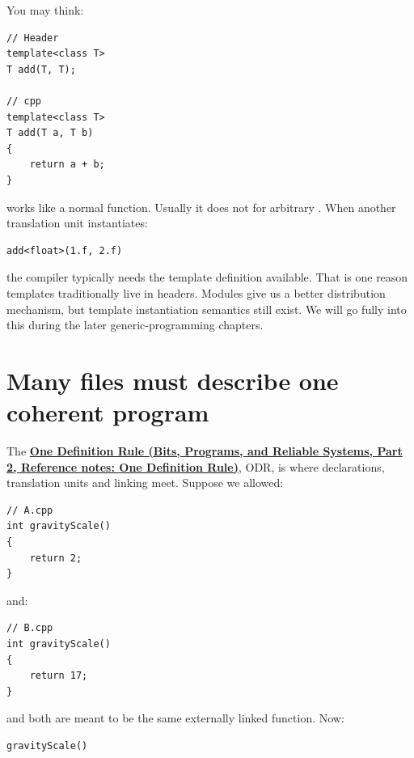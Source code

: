 \hypertarget{05-engine-i-ch002-templates-complicate-the-old-declarationimplementation-split}{}

You may think:

\begin{verbatim}
// Header
template<class T>
T add(T, T);

// cpp
template<class T>
T add(T a, T b)
{
    return a + b;
}
\end{verbatim}

works like a normal function. Usually it does not for arbitrary . When another translation unit instantiates:

\begin{verbatim}
add<float>(1.f, 2.f)
\end{verbatim}

the compiler typically needs the template definition available. That is one reason templates traditionally live in headers. Modules give us a better distribution mechanism, but template instantiation semantics still exist. We will go fully into this during the later generic-programming chapters.

\section{Many files must describe one coherent program}\label{05-engine-i-ch002-many-files-must-describe-one-coherent-program}

\hypertarget{05-engine-i-ch002-many-files-must-describe-one-coherent-program}{}

The \textbf{\href{../01-Bits-Programs-and-Reliable-Systems-P02/main.pdf\#appendix-49d27bc9d9a5}{One Definition Rule (Bits, Programs, and Reliable Systems, Part 2, Reference notes: One Definition Rule)}}, ODR, is where declarations, translation units and linking meet. Suppose we allowed:

\begin{verbatim}
// A.cpp
int gravityScale()
{
    return 2;
}
\end{verbatim}

and:

\begin{verbatim}
// B.cpp
int gravityScale()
{
    return 17;
}
\end{verbatim}

and both are meant to be the same externally linked function. Now:

\begin{verbatim}
gravityScale()
\end{verbatim}

